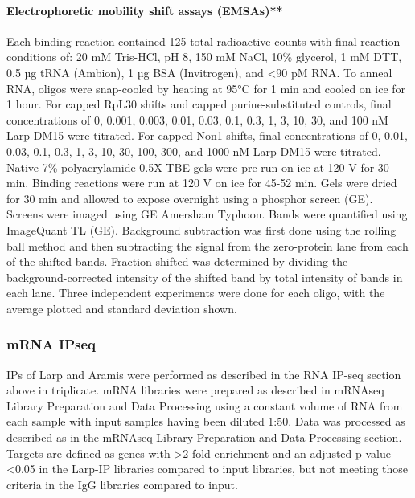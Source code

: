 \documentclass[12pt,oneside]{reedthesis}
\begin{document}
\hypertarget{electrophoretic-mobility-shift-assays-emsas}{%
\paragraph{Electrophoretic mobility shift assays (EMSAs)**}\label{electrophoretic-mobility-shift-assays-emsas}}

Each binding reaction contained 125 total radioactive counts with final reaction conditions of: 20 mM Tris-HCl, pH 8, 150 mM NaCl, 10\% glycerol, 1 mM DTT, 0.5 µg tRNA (Ambion), 1 µg BSA (Invitrogen), and \textless90 pM RNA. To anneal RNA, oligos were snap-cooled by heating at 95°C for 1 min and cooled on ice for 1 hour. For capped RpL30 shifts and capped purine-substituted controls, final concentrations of 0, 0.001, 0.003, 0.01, 0.03, 0.1, 0.3, 1, 3, 10, 30, and 100 nM Larp-DM15 were titrated. For capped Non1 shifts, final concentrations of 0, 0.01, 0.03, 0.1, 0.3, 1, 3, 10, 30, 100, 300, and 1000 nM Larp-DM15 were titrated. Native 7\% polyacrylamide 0.5X TBE gels were pre-run on ice at 120 V for 30 min. Binding reactions were run at 120 V on ice for 45-52 min. Gels were dried for 30 min and allowed to expose overnight using a phosphor screen (GE). Screens were imaged using GE Amersham Typhoon. Bands were quantified using ImageQuant TL (GE). Background subtraction was first done using the rolling ball method and then subtracting the signal from the zero-protein lane from each of the shifted bands. Fraction shifted was determined by dividing the background-corrected intensity of the shifted band by total intensity of bands in each lane. Three independent experiments were done for each oligo, with the average plotted and standard deviation shown.

\hypertarget{mrna-ipseq}{%
\subsubsection{mRNA IPseq}\label{mrna-ipseq}}

IPs of Larp and Aramis were performed as described in the RNA IP-seq section above in triplicate. mRNA libraries were prepared as described in mRNAseq Library Preparation and Data Processing using a constant volume of RNA from each sample with input samples having been diluted 1:50. Data was processed as described as in the mRNAseq Library Preparation and Data Processing section. Targets are defined as genes with \textgreater2 fold enrichment and an adjusted p-value \textless0.05 in the Larp-IP libraries compared to input libraries, but not meeting those criteria in the IgG libraries compared to input.
\end{document}

